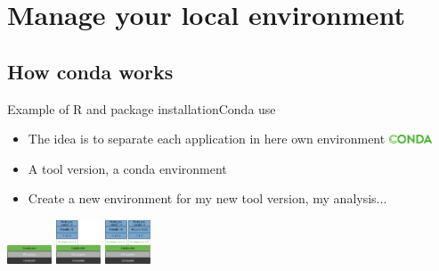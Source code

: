 \section{Manage your local environment}
\subsection{How conda works}
\begin{frame}{Example of R and package installation}{Conda use}
\begin{itemize}
	\item The idea is to separate each application in here own environment \includegraphics[width=0.1\textwidth]{images/conda_logo.pdf}
	\item A tool version, a conda environment
	\item Create a new environment for my new tool version, my analysis...
\end{itemize}
\includegraphics[width=0.1\textwidth]{images/conda_env_5.pdf} 
\includegraphics[width=0.1\textwidth]{images/conda_env_6.pdf} 
\includegraphics[width=0.1\textwidth]{images/conda_env_7.pdf} 
\end{frame}
